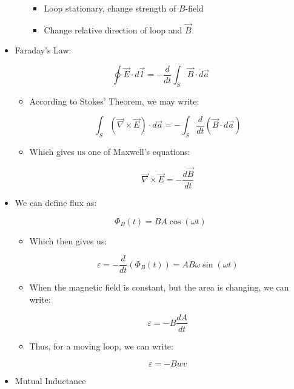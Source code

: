 \begin{itemize}
\begin{itemize}
\begin{itemize}
          \item Loop stationary, change strength of $B$-field

          \item Change relative direction of loop and $\vec{B}$

        \end{itemize}

    \end{itemize}

  \item Faraday's Law:

    $$\oint\vec{E}\cdot d\vec{l}=-\frac{d}{dt}\int_S\vec{B}\cdot d\vec{a}$$

    \begin{itemize}

      \item According to Stokes' Theorem, we may write:

        $$\int_S(\vec{\nabla}\times\vec{E})\cdot d\vec{a}=-\int_S\frac{d}{dt}(\vec{B}\cdot d\vec{a})$$

      \item Which gives us one of Maxwell's equations:

        $$\vec{\nabla}\times\vec{E}=-\frac{d\vec{B}}{dt}$$

    \end{itemize}

  \item We can define flux as:

    $$\Phi_B(t)=BA\cos(\omega t)$$

    \begin{itemize}

      \item Which then gives us:

        $$\varepsilon=-\frac{d}{dt}(\Phi_B(t))=AB\omega\sin(\omega t)$$

      \item When the magnetic field is constant, but the area is changing, we can write:

        $$\varepsilon=-B\frac{dA}{dt}$$

      \item Thus, for a moving loop, we can write:

        $$\varepsilon=-Bwv$$

    \end{itemize}

  \item Mutual Inductance


\end{itemize}
